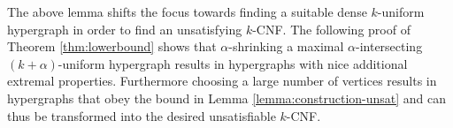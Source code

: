 \documentclass[11pt,letterpaper]{article}
\newtheorem{theorem}{Theorem}
\begin{document}
\medskip

The above lemma shifts the focus towards finding a suitable dense $k$-uniform hypergraph in order to find an unsatisfying $k$-CNF. The following proof of Theorem \ref{thm:lowerbound} shows that $\alpha$-shrinking a maximal $\alpha$-intersecting $(k+\alpha)$-uniform hypergraph results in hypergraphs with nice additional extremal properties. Furthermore choosing a large number of vertices results in hypergraphs that obey the bound in Lemma \ref{lemma:construction-unsat} and can thus be transformed into the desired unsatisfiable $k$-CNF.

\iffalse
\begin{theorem}\label{thm:upperbound}
For any $k$ and $\alpha < k$ there is an unsatisfiable $\alpha$-intersecting $k$-CNF with at most
$$i = \alpha^2 2^{(k+\alpha)(2+1/\alpha)} k^{(5+2/\alpha)}$$
clause intersections 
$$n = 2\alpha 2^{k/\alpha} k^{2(1+1/\alpha)}$$
variables
$$m = \alpha 2^{(k+\alpha)(1+1/\alpha)}{k^{2(1+1/\alpha)}}$$
clauses and a maximum degree of
$$\Delta < \alpha 2^{(k+\alpha)}k^3$$.
\end{theorem}
\fi
\end{document}
